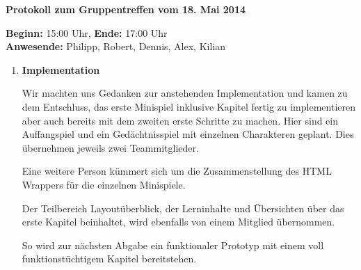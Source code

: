 \documentclass[a4paper]{article}
\newcommand{\changefont}[3]{
\fontfamily{#1} \fontseries{#2} \fontshape{#3} \selectfont}
\newcommand{\TOP}[1]{\item \textbf{#1}\par}
\begin{document}
\changefont{cmss}{m}{n} %


\begin{center}
\textbf{\Large Protokoll zum Gruppentreffen vom 18. Mai 2014}
\end{center}
\vspace{3mm}

\textbf{Beginn:} 15:00 Uhr, \textbf{Ende:} 17:00 Uhr\\
\textbf{Anwesende:} Philipp, Robert, Dennis, Alex, Kilian

\vspace{5mm}

\begin{enumerate}


\TOP{Implementation}

Wir machten uns Gedanken zur anstehenden Implementation und kamen zu dem Entschluss, das erste Minispiel inklusive Kapitel fertig zu implementieren aber auch bereits mit dem zweiten erste Schritte zu machen. Hier sind ein Auffangspiel und ein Gedächtnisspiel mit einzelnen Charakteren geplant. Dies übernehmen jeweils zwei Teammitglieder.

Eine weitere Person kümmert sich um die Zusammenstellung des HTML Wrappers für die einzelnen Minispiele. 

Der Teilbereich Layoutüberblick, der Lerninhalte und Übersichten über das erste Kapitel beinhaltet, wird ebenfalls von einem Mitglied übernommen.

So wird zur nächsten Abgabe ein funktionaler Prototyp mit einem voll funktionstüchtigem Kapitel bereitstehen.


\end{enumerate}


\makeatletter
\def\footrule{{
  \vskip-\footruleskip\vskip-\footrulewidth
  \color{\footrulecolor}
  \hrule\@width\headwidth\@height
  \footrulewidth\vskip\footruleskip
}}
\makeatother
\renewcommand{\footrulewidth}{3pt}
\newcommand{\footrulecolor}{dgreen}
\end{document}
